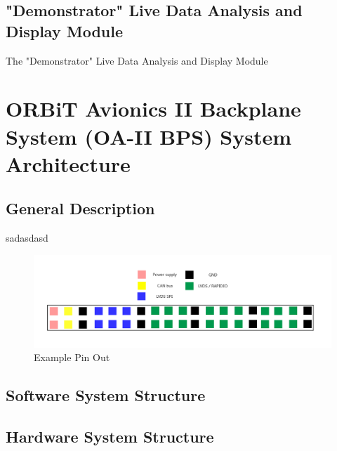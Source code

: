 \documentclass[12pt,article]{memoir}
\begin{document}
\section{"Demonstrator" Live Data Analysis and Display Module}
The "Demonstrator" Live Data Analysis and Display Module
\chapter{ORBiT Avionics II Backplane System (OA-II BPS) System Architecture}
\section{General Description}
sadasdasd
\begin{figure}[h]
\includegraphics[width=\textwidth]{BPS_Pin.png}
 \caption{Example Pin Out}	
\end{figure}
\section{Software System Structure}
\section{Hardware System Structure}
\end{document}
